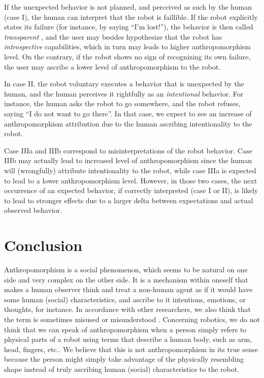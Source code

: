 \documentclass[twocolumn]{svjour3}          %
\begin{document}
If the unexpected behavior is not planned, and perceived as such by the human
(case I), the human can interpret that the robot is faillible. If the robot
explicitly states its failure (for instance, by saying ``I'm lost!''), the
behavior is then called \emph{transparent} , and the
user may besides hypothesize that the robot has \emph{introspective}
capabilities, which in turn may leads to higher anthropomorphism level.  On the
contrary, if the robot shows no sign of recognizing its own failure, the user
may ascribe a lower level of anthropomorphism to the robot.

In case II, the robot voluntary executes a behavior that is unexpected by the
human, and the human perceives it rightfully as an \emph{intentional} behavior.
For instance, the human asks the robot to go somewhere, and the robot refuses,
saying ``I do not want to go there''. In that case, we expect to see an
increase of anthropomorphism attribution due to the human ascribing
intentionality to the robot.

Case IIIa and IIIb correspond to misinterpretations of the robot behavior. Case
IIIb may actually lead to increased level of anthropomorphism since the human
will (wrongfully) attribute intentionality to the robot, while case IIIa is
expected to lead to a lower anthropomorphism level.  However, in those two
cases, the next occurrence of an expected behavior, if correctly interpreted
(case I or II), is likely to lead to stronger effects due to a larger delta
between expectations and actual observed behavior.




%
%
%
%
%
%


\section{Conclusion}
\label{sec:9}


	Anthropomorphism is a social phenomenon, which seems to be natural on one side and very complex on the other side. It is a mechanism within oneself that makes a human observer think and treat a non-human agent as if it would have some human (social) characteristics, and ascribe to it intentions, emotions, or thoughts, for instance. In accordance with other researchers, we also think that the term is sometimes misused or misunderstood \cite{duffy_anthropomorphism_2002}. Concerning robotics, we do not think that we can speak of anthropomorphism when a person simply refers to physical parts of a robot using terms that describe a human body, such as arm, head, fingers, etc.. We believe that this is not anthropomorphism in its true sense because the person might simply take advantage of the physically resembling shape instead of truly ascribing human (social) characteristics to the robot.
\end{document}
